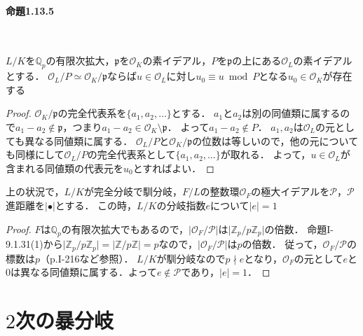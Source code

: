 \paragraph{命題1.13.5}~
\begin{screen}
  $L/K$を$\mathbb{Q}_p$の有限次拡大，$\mathfrak{p}$を$\mathcal{O}_K$の素イデアル，$P$を$\mathfrak{p}$の上にある$\mathcal{O}_L$の素イデアルとする．
  $\mathcal{O}_L/P\simeq\mathcal{O}_K/\mathfrak{p}$ならば$u\in\mathcal{O}_L$に対し$u_0\equiv u\bmod P$となる$u_0\in\mathcal{O}_K$が存在する
\end{screen}
\begin{proof}
  $\mathcal{O}_K/\mathfrak{p}$の完全代表系を$\{a_1,a_2,\ldots\}$とする．
  $a_1$と$a_2$は別の同値類に属するので$a_1-a_2\not\in\mathfrak{p}$，つまり$a_1-a_2\in\mathcal{O}_K\setminus\mathfrak{p}$．
  よって$a_1-a_2\not\in P$．
  $a_1, a_2$は$\mathcal{O}_L$の元としても異なる同値類に属する．
  $\mathcal{O}_L/P$と$\mathcal{O}_K/\mathfrak{p}$の位数は等しいので，他の元についても同様にして$\mathcal{O}_L/P$の完全代表系として$\{a_1,a_2,\ldots\}$が取れる．
  よって，$u\in\mathcal{O}_L$が含まれる同値類の代表元を$u_0$とすればよい．
\end{proof}

\begin{screen}
  上の状況で，$L/K$が完全分岐で馴分岐，$F/L$の整数環$\mathcal{O}_F$の極大イデアルを$\mathcal{P}$，$\mathcal{P}$進距離を$\lvert\bullet\rvert$とする．
  この時，$L/K$の分岐指数$e$について$\lvert e\rvert=1$
\end{screen}
\begin{proof}
  $F$は$\mathbb{Q}_p$の有限次拡大でもあるので，$\lvert\mathcal{O}_F/\mathcal{P}\rvert$は$\lvert\mathbb{Z}_p/p\mathbb{Z}_p\rvert$の倍数．
  命題I-9.1.31(1)から$\lvert\mathbb{Z}_p/p\mathbb{Z}_p\rvert=\lvert\mathbb{Z}/p\mathbb{Z}\rvert=p$なので，$\lvert\mathcal{O}_F/\mathcal{P}\rvert$は$p$の倍数．
  従って，$\mathcal{O}_F/\mathcal{P}$の標数は$p$（p.I-216など参照）．
  $L/K$が馴分岐なので$p \nmid e$となり，$\mathcal{O}_F$の元として$e$と$0$は異なる同値類に属する．よって$e\not\in\mathcal{P}$であり，$\lvert e\rvert=1$．
\end{proof}

\section{$2$次の暴分岐}
